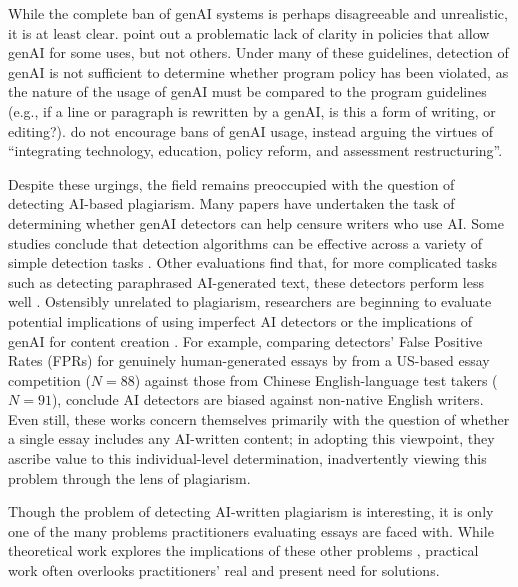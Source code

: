While the complete ban of genAI systems is perhaps disagreeable and unrealistic, it is at least clear. \textcite{mike_perkins_decoding_2023} point out a problematic lack of clarity in policies that allow genAI for some uses, but not others. Under many of these guidelines, detection of genAI is not sufficient to determine whether program policy has been violated, as the nature of the usage of genAI must be compared to the program guidelines (e.g., if a line or paragraph is rewritten by a genAI, is this a form of writing, or editing?). \textcite{mike_perkins_decoding_2023} do not encourage bans of genAI usage, instead arguing the virtues of ``integrating technology, education, policy reform, and assessment restructuring''.

Despite these urgings, the field remains preoccupied with the question of detecting AI-based plagiarism. Many papers have undertaken the task of determining whether genAI detectors can help censure writers who use AI. Some studies conclude that detection algorithms can be effective across a variety of simple detection tasks \cite{dugan_raid_2024,weber-wulff_testing_2023,tharindu_kumarage_stylometric_2023,elkhatat_evaluating_2023,mitchell_detectgpt_2023}. Other evaluations find that, for more complicated tasks such as detecting paraphrased AI-generated text, these detectors perform less well \cite{kalpesh_krishna_paraphrasing_2023}. Ostensibly unrelated to plagiarism, researchers are beginning to evaluate potential implications of using imperfect AI detectors \cite{liang_gpt_2023} or the implications of genAI for content creation \cite{kalpesh_krishna_paraphrasing_2023}. For example, comparing detectors' False Positive Rates (FPRs) for genuinely human-generated essays by from a US-based essay competition ($N = 88$) against those from Chinese English-language test takers ($N = 91$), \textcite{liang_gpt_2023} conclude AI detectors are biased against non-native English writers. Even still, these works concern themselves primarily with the question of whether a single essay includes any AI-written content; in adopting this viewpoint, they ascribe value to this individual-level determination, inadvertently viewing this problem through the lens of plagiarism.

Though the problem of detecting AI-written plagiarism is interesting, it is only one of the many problems practitioners evaluating essays are faced with. While theoretical work explores the implications of these other problems \cite{otterbacher_why_2023,yu_huang_reflection_2023}, practical work often overlooks practitioners' real and present need for solutions.

